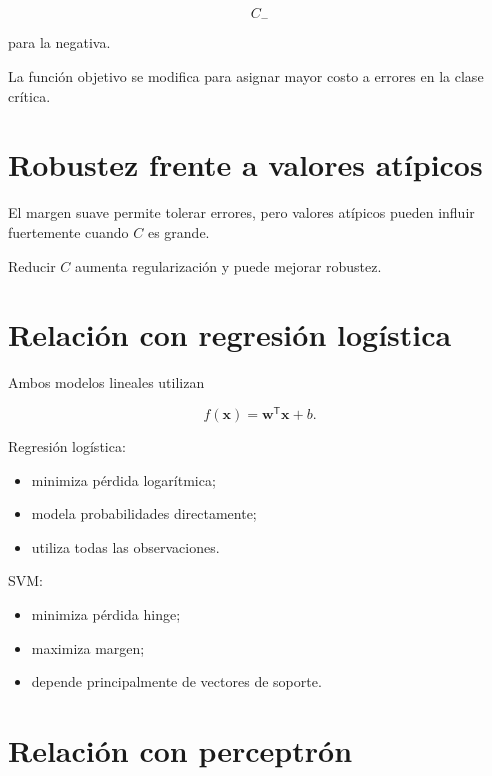 \documentclass[
  spanish,
  10.5pt,
  letterpaper,
  DIV=11,
  numbers=noendperiod,
  oneside,
  open=any]{scrreprt}
\providecommand{\tightlist}{%
  \setlength{\itemsep}{0pt}\setlength{\parskip}{0pt}}
\theoremstyle{definition}
\theoremstyle{definition}
\theoremstyle{plain}
\theoremstyle{remark}
\begin{document}
\[
C_-
\]

para la negativa.

La función objetivo se modifica para asignar mayor costo a errores en la
clase crítica.

\section*{Robustez frente a valores
atípicos}\label{robustez-frente-a-valores-atuxedpicos}


El margen suave permite tolerar errores, pero valores atípicos pueden
influir fuertemente cuando \(C\) es grande.

Reducir \(C\) aumenta regularización y puede mejorar robustez.

\section*{Relación con regresión
logística}\label{relaciuxf3n-con-regresiuxf3n-loguxedstica-4}


Ambos modelos lineales utilizan

\[
f(\mathbf{x})
=
\mathbf{w}^{\mathsf T}\mathbf{x}+b.
\]

Regresión logística:

\begin{itemize}
\tightlist
\item
  minimiza pérdida logarítmica;
\item
  modela probabilidades directamente;
\item
  utiliza todas las observaciones.
\end{itemize}

SVM:

\begin{itemize}
\tightlist
\item
  minimiza pérdida hinge;
\item
  maximiza margen;
\item
  depende principalmente de vectores de soporte.
\end{itemize}

\section*{Relación con perceptrón}\label{relaciuxf3n-con-perceptruxf3n}
\end{document}
